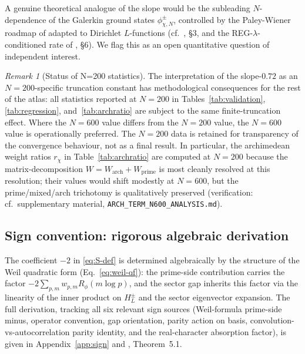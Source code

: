 \documentclass[a4paper,10pt,twocolumn]{article}
\theoremstyle{definition}
\theoremstyle{remark}
\newtheorem{remark}[theorem]{Remark}
\newcommand{\chifn}{\chi}
\begin{document}
A genuine theoretical analogue of the slope would be the
subleading $N$-dependence of the Galerkin ground states
$\phi^\pm_{\chifn,N}$, controlled by the Paley-Wiener roadmap of
\cite{RH_II} adapted to Dirichlet $L$-functions (cf.\
\cite{AnalyticGroundstate}, \S3, and the REG-$\lambda$-conditioned
rate of \cite{RH_II}, \S6). We flag this as an open quantitative
question of independent interest.

\begin{remark}[Status of N=200 statistics]
\label{rem:n200-status}
The interpretation of the slope-$0.72$ as an $N=200$-specific
truncation constant has methodological consequences for the rest of
the atlas: all statistics reported at $N=200$ in
Tables~\ref{tab:validation}, \ref{tab:regression},
and~\ref{tab:archratio} are subject to the same finite-truncation
effect. Where the $N=600$ value differs from the $N=200$ value, the
$N=600$ value is operationally preferred. The $N=200$ data is
retained for transparency of the convergence behaviour, not as a
final result. In particular, the archimedean weight ratios
$r_\chi$ in Table~\ref{tab:archratio} are computed at $N=200$
because the matrix-decomposition $W=W_{\mathrm{arch}}+W_{\mathrm{prime}}$
is most cleanly resolved at this resolution; their values would
shift modestly at $N=600$, but the prime/mixed/arch trichotomy is
qualitatively preserved (verification: cf.\ supplementary material,
\texttt{ARCH\_TERM\_N600\_ANALYSIS.md}).
\end{remark}

\subsection{Sign convention: rigorous algebraic derivation}
\label{sec:discussion-sign}

The coefficient $-2$ in \eqref{eq:S-def} is determined algebraically
by the structure of the Weil quadratic form (Eq.~\eqref{eq:weil-qf}):
the prime-side contribution carries the factor
$-2\sum_{p,m}w_{p,m}R_\phi(m\log p)$, and the sector gap inherits this
factor via the linearity of the inner product on $H_L^\pm$ and the
sector eigenvector expansion. The full derivation, tracking all six
relevant sign sources (Weil-formula prime-side minus, operator
convention, gap orientation, parity action on basis,
convolution-vs-autocorrelation parity identity, and the real-character
absorption factor), is given in Appendix~\ref{app:sign} and
\cite{AnalyticKernelV2}, Theorem~5.1.
\end{document}
